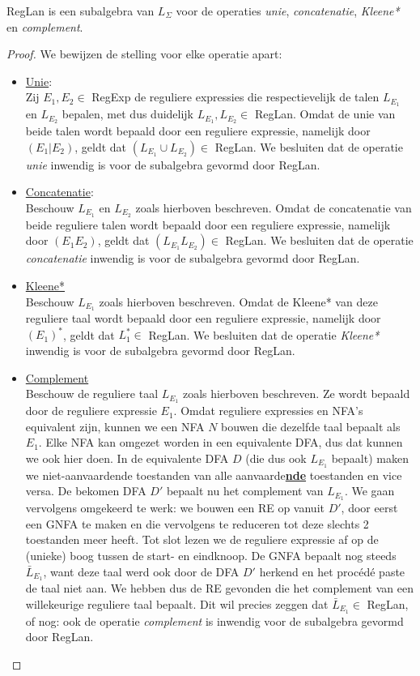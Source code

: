 \documentclass[../aanvullingen_cursus.tex]{subfiles}
\begin{document}
\begin{stelling}
	RegLan is een subalgebra van \(L_{\Sigma}\) voor de operaties \textit{unie}, \textit{concatenatie}, \textit{Kleene*} en \textit{complement}.
\end{stelling}

\begin{proof}
	We bewijzen de stelling voor elke operatie apart:

	\begin{itemize}

		\item \underline{Unie}:\\
		Zij \(E_1,E_2 \in \) RegExp de reguliere expressies die respectievelijk de talen \(L_{E_1}\) en \(L_{E_2}\) bepalen, met dus duidelijk \(L_{E_1},L_{E_2} \in \) RegLan. Omdat de unie van beide talen wordt bepaald door een reguliere expressie, namelijk door \((E_1|E_2)\), geldt dat \((L_{E_1}\cup L_{E_2}) \in \) RegLan. We besluiten dat de operatie \textit{unie} inwendig is voor de subalgebra gevormd door RegLan.
		\item \underline{Concatenatie}:\\
		Beschouw \(L_{E_1}\) en \(L_{E_2}\) zoals hierboven beschreven. Omdat de concatenatie van beide reguliere talen wordt bepaald door een reguliere expressie, namelijk door \((E_1E_2)\), geldt dat \((L_{E_1}L_{E_2}) \in \) RegLan. We besluiten dat de operatie \textit{concatenatie} inwendig is voor de subalgebra gevormd door RegLan.
		\item \underline{Kleene*}\\
		Beschouw \(L_{E_1}\) zoals hierboven beschreven. Omdat de Kleene* van deze reguliere taal wordt bepaald door een reguliere expressie, namelijk door \((E_1)^*\), geldt dat \(L_1^* \in\) RegLan. We besluiten dat de operatie \textit{Kleene*} inwendig is voor de subalgebra gevormd door RegLan.
		\item \underline{Complement}\\
		Beschouw de reguliere taal \(L_{E_1}\) zoals hierboven beschreven. Ze wordt bepaald door de reguliere expressie \(E_1\). Omdat reguliere expressies en NFA's equivalent zijn, kunnen we een NFA \(N\) bouwen die dezelfde taal bepaalt als \(E_1\). Elke NFA kan omgezet worden in een equivalente DFA, dus dat kunnen we ook hier doen. In de equivalente DFA \(D\) (die dus ook \(L_{E_1}\) bepaalt) maken we niet-aanvaardende toestanden van alle aanvaarde\underline{\textbf{nde}} toestanden en vice versa. De bekomen DFA \(D'\) bepaalt nu het complement van \(L_{E_1}\). We gaan vervolgens omgekeerd te werk: we bouwen een RE op vanuit \(D'\), door eerst een GNFA te maken en die vervolgens te reduceren tot deze slechts 2 toestanden meer heeft. Tot slot lezen we de reguliere expressie af op de (unieke) boog tussen de start- en eindknoop. De GNFA bepaalt nog steeds \(\bar{L}_{E_1}\), want deze taal werd ook door de DFA \(D'\) herkend en het procédé paste de taal niet aan. We hebben dus de RE gevonden die het complement van een willekeurige reguliere taal bepaalt. Dit wil precies zeggen dat \(\bar{L}_{E_1} \in \) RegLan, of nog: ook de operatie \textit{complement} is inwendig voor de subalgebra gevormd door RegLan.


\end{itemize}
\end{proof}
\end{document}
